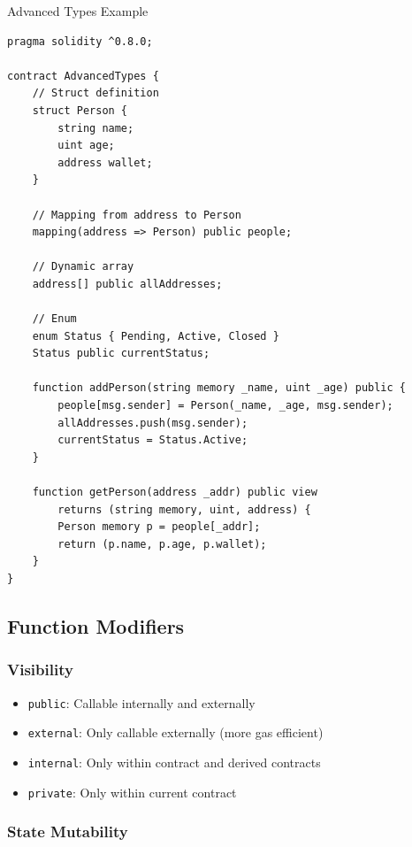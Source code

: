 \documentclass[11pt,a4paper]{article}
\begin{document}
\begin{examplebox}{Advanced Types Example}
\begin{lstlisting}[language=Solidity]
pragma solidity ^0.8.0;

contract AdvancedTypes {
    // Struct definition
    struct Person {
        string name;
        uint age;
        address wallet;
    }

    // Mapping from address to Person
    mapping(address => Person) public people;

    // Dynamic array
    address[] public allAddresses;

    // Enum
    enum Status { Pending, Active, Closed }
    Status public currentStatus;

    function addPerson(string memory _name, uint _age) public {
        people[msg.sender] = Person(_name, _age, msg.sender);
        allAddresses.push(msg.sender);
        currentStatus = Status.Active;
    }

    function getPerson(address _addr) public view
        returns (string memory, uint, address) {
        Person memory p = people[_addr];
        return (p.name, p.age, p.wallet);
    }
}
\end{lstlisting}
\end{examplebox}

\subsection{Function Modifiers}

\subsubsection{Visibility}

\begin{itemize}
  \item \texttt{public}: Callable internally and externally
  \item \texttt{external}: Only callable externally (more gas efficient)
  \item \texttt{internal}: Only within contract and derived contracts
  \item \texttt{private}: Only within current contract
\end{itemize}

\subsubsection{State Mutability}
\end{document}

